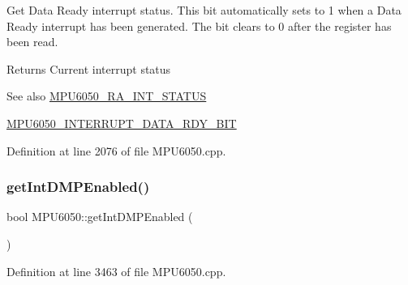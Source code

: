 Get Data Ready interrupt status. This bit automatically sets to 1 when a Data Ready interrupt has been generated. The bit clears to 0 after the register has been read. \begin{DoxyReturn}{Returns}
Current interrupt status 
\end{DoxyReturn}
\begin{DoxySeeAlso}{See also}
\mbox{\hyperlink{MPU6050_8h_a8337320c5ccc92def830e968d2e19d75}{M\+P\+U6050\+\_\+\+R\+A\+\_\+\+I\+N\+T\+\_\+\+S\+T\+A\+T\+US}} 

\mbox{\hyperlink{MPU6050_8h_af58fafd4db7755e66e0beab54e88c41d}{M\+P\+U6050\+\_\+\+I\+N\+T\+E\+R\+R\+U\+P\+T\+\_\+\+D\+A\+T\+A\+\_\+\+R\+D\+Y\+\_\+\+B\+IT}} 
\end{DoxySeeAlso}


Definition at line 2076 of file M\+P\+U6050.\+cpp.


\begin{DoxyCode}{0}

\end{DoxyCode}
\mbox{\label{classMPU6050_a3af3f3c0a16b5b68cf6301cb0ac3f392}} 
\subsubsection{\texorpdfstring{getIntDMPEnabled()}{getIntDMPEnabled()}}
{\footnotesize\ttfamily bool M\+P\+U6050\+::get\+Int\+D\+M\+P\+Enabled (\begin{DoxyParamCaption}{ }\end{DoxyParamCaption})}



Definition at line 3463 of file M\+P\+U6050.\+cpp.



